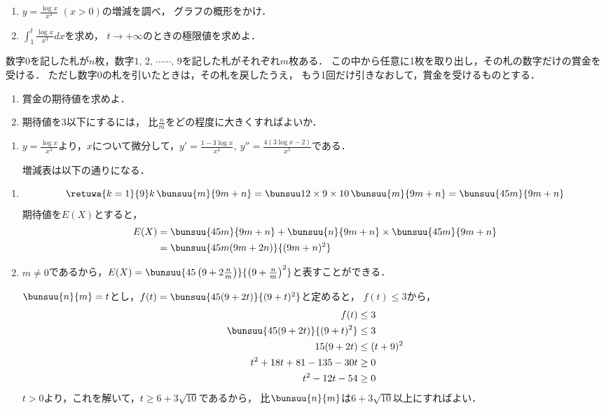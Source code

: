 \begin{problem}
  \begin{enumerate}
\item $\displaystyle y=\frac{\log x}{x^3}$ $(x>0)$の増減を調べ，
グラフの概形をかけ．
\item $\displaystyle\int_1^t\frac{\log x}{x^3}dx$を求め，
$t\to+\infty$のときの極限値を求めよ．
\end{enumerate}

数字0を記した札が$n$枚，数字$1, \, 2, \, \cdots\cdots, \, 9$を記した札がそれぞれ$m$枚ある．
この中から任意に1枚を取り出し，その札の数字だけの賞金を受ける．
ただし数字0の札を引いたときは，その札を戻したうえ，
もう1回だけ引きなおして，賞金を受けるものとする．
\begin{enumerate}
\item 賞金の期待値を求めよ．
\item 期待値を3以下にするには，
比$\displaystyle\frac{n}{m}$をどの程度に大きくすればよいか．
\end{enumerate}
\end{problem}

\begin{enumerate}
  \item $y = \frac{\log x}{x^3}$より，$x$について微分して，$y' = \frac{1-3\log x}{x^4},\ y'' = \frac{4(3\log x - 2)}{x^5}$である．

  増減表は以下の通りになる．


\end{enumerate}

\begin{enumerate}
  \item
  \[\retuwa{k=1}{9} k\,\bunsuu{m}{9m + n}
    = \bunsuu12 \times 9 \times 10\,\bunsuu{m}{9m + n}
    = \bunsuu{45m}{9m + n}
  \]
  期待値を$E(X)$とすると，
  \begin{align*}
    E(X) &= \bunsuu{45m}{9m + n} + \bunsuu{n}{9m + n} \times
      \bunsuu{45m}{9m + n} \\
    &= \bunsuu{45m(9m + 2n)}{(9m + n)^2}
  \end{align*}

  \item $m \neq 0$であるから，$E(X) = \bunsuu{45\left(9 + 2\frac{n}{m}\right)}{\left(9 + \frac{n}{m}\right)^2}$と表すことができる．

  $\bunsuu{n}{m} = t$とし，$f(t) = \bunsuu{45(9 + 2t)}{(9+t)^2}$と定めると，
  $f(t) \leq 3$から，
  \begin{align*}
    f(t) &\leq 3 \\
    \bunsuu{45(9+2t)}{(9+t)^2} &\leq 3 \\
    15(9+2t) &\leq (t+9)^2 \\
    t^2 + 18t + 81 - 135 - 30t &\geq 0\\
    t^2 - 12t - 54 &\geq 0
  \end{align*}
  $t > 0$より，これを解いて，$t \geq 6 + 3\sqrt{10}$であるから，
  比$\bunsuu{n}{m}$は$6 + 3\sqrt{10}$以上にすればよい．

\end{enumerate}
